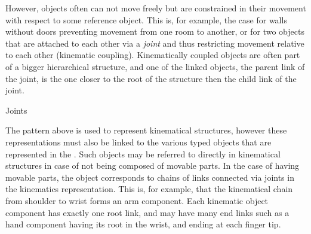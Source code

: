However, objects often can not move freely but are constrained in their movement with respect to some reference object.
This is, for example, the case for walls without doors preventing movement from one room to another, or for two objects that are attached to each other via a \emph{joint} and thus restricting movement relative to each other (kinematic coupling).
Kinematically coupled objects are often part of a bigger hierarchical structure, and one of the linked objects, the parent link of the joint, is the one closer to the root of the structure then the child link of the joint.

\begin{ODP}{Joints}
\end{ODP}

The pattern above is used to represent kinematical structures, however these representations must also be linked to the various typed objects that are represented in the \neembak.
Such objects may be referred to directly in kinematical structures in case of not being composed of movable parts.
In the case of having movable parts, the object corresponds to chains of links connected via joints in the kinematics representation.
This is, for example, that the kinematical chain from shoulder to wrist forms an arm component.
Each kinematic object component has exactly one root link, and may have many end links such as a hand component having its root in the wrist, and ending at each finger tip.

